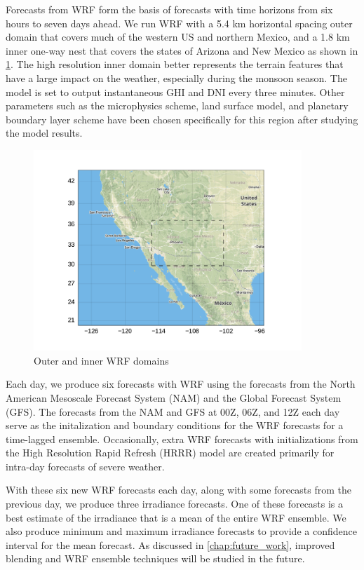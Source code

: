 Forecasts from WRF form the basis of forecasts with time horizons from
six hours to seven days ahead.
We run WRF with a 5.4 km horizontal spacing outer domain that covers
much of the western US and northern Mexico, and a 1.8 km inner one-way
nest that covers the states of Arizona and New Mexico as shown in
\cref{fig:wrfdomains}.
The high resolution inner domain better represents the terrain
features that have a large impact on the weather, especially during
the monsoon season.
The model is set to output instantaneous GHI and DNI every three minutes.
Other parameters such as the microphysics scheme, land surface model,
and planetary boundary layer scheme have been chosen specifically for
this region after studying the model results.

\begin{figure}[htb]
\centering
\includegraphics[width=0.9\textwidth]{figs/domains.pdf}
\vspace{-1.5em}
\caption{Outer and inner WRF domains}
\label{fig:wrfdomains}
\end{figure}

Each day, we produce six forecasts with WRF using the forecasts from
the North American Mesoscale Forecast System (NAM) and the Global
Forecast System (GFS).
The forecasts from the NAM and GFS at 00Z, 06Z, and 12Z each day serve
as the initalization and boundary conditions for the WRF forecasts for
a time-lagged ensemble.
Occasionally, extra WRF forecasts with initializations from the High
Resolution Rapid Refresh (HRRR) model are created primarily for
intra-day forecasts of severe weather.

With these six new WRF forecasts each day, along with some forecasts
from the previous day, we produce three irradiance forecasts.
One of these forecasts is a best estimate of the irradiance that is a
mean of the entire WRF ensemble.
We also produce minimum and maximum irradiance forecasts to provide a
confidence interval for the mean forecast.
As discussed in \cref{chap:future_work}, improved blending and WRF
ensemble techniques will be studied in the future.

